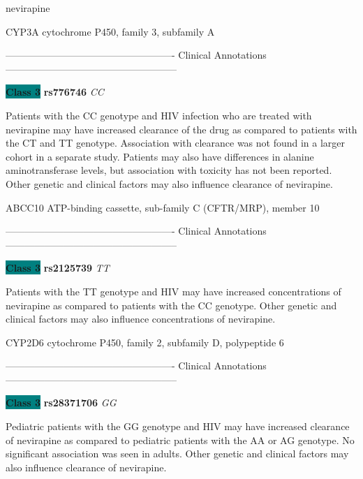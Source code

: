 \documentclass{resume} %
\begin{document}
\begin{rSection}{ nevirapine }
\begin{rSubsection}{ CYP3A }{ cytochrome P450, family 3, subfamily A }{}{}
\item[] ---------------------------------------------------- Clinical Annotations -----------------------------------------------------\newline
\item \textbf{\colorbox{teal} {Class 3}} \textbf{ rs776746 } \textit{ CC }
\item[] Patients with the CC genotype and HIV infection who are treated with nevirapine may have increased clearance of the drug as compared to patients with the CT and TT genotype. Association with clearance was not found in a larger cohort in a separate study. Patients may also have differences in alanine aminotransferase levels, but association with toxicity has not been reported. Other genetic and clinical factors may also influence clearance of nevirapine.
\end{rSubsection}\begin{rSubsection}{ ABCC10 }{ ATP-binding cassette, sub-family C (CFTR/MRP), member 10 }{}{}
\item[]

\item[] ---------------------------------------------------- Clinical Annotations -----------------------------------------------------\newline
\item \textbf{\colorbox{teal} {Class 3}} \textbf{ rs2125739 } \textit{ TT }
\item[] Patients with the TT genotype and HIV may have increased concentrations of nevirapine as compared to patients with the CC genotype. Other genetic and clinical factors may also influence concentrations of nevirapine.
\end{rSubsection}\begin{rSubsection}{ CYP2D6 }{ cytochrome P450, family 2, subfamily D, polypeptide 6 }{}{}
\item[]

\item[] ---------------------------------------------------- Clinical Annotations -----------------------------------------------------\newline
\item \textbf{\colorbox{teal} {Class 3}} \textbf{ rs28371706 } \textit{ GG }
\item[] Pediatric patients with the GG genotype and HIV may have increased clearance of nevirapine as compared to pediatric patients with the AA or AG genotype. No significant association was seen in adults. Other genetic and clinical factors may also influence clearance of nevirapine.
\end{rSubsection}


\end{rSection}
\end{document}
